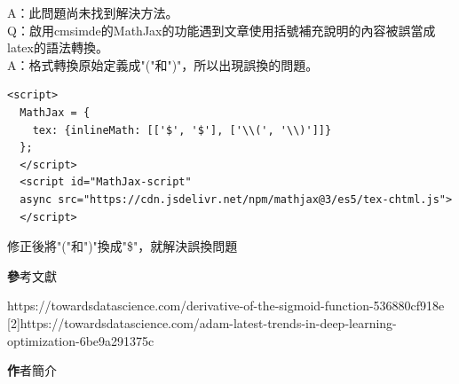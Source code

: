 \documentclass[14pt,a4paper]{report}  %
\begin{document}
A：此問題尚未找到解決方法。\\


Q：啟用cmsimde的MathJax的功能遇到文章使用括號補充說明的內容被誤當成latex的語法轉換。\\

A：格式轉換原始定義成"("和")"，所以出現誤換的問題。\\
\begin{lstlisting}[caption=\Large\sectionef MathJax 程式碼]
<script>
  MathJax = {
    tex: {inlineMath: [['$', '$'], ['\\(', '\\)']]}
  };
  </script>
  <script id="MathJax-script" 
  async src="https://cdn.jsdelivr.net/npm/mathjax@3/es5/tex-chtml.js"> 
  </script>
\end{lstlisting}

修正後將"("和")"換成"\$"，就解決誤換問題
\newpage
\begin{center}
\LARGE\textbf 參考文獻\\
\end{center}
\begin{flushleft}
\begin{Large}
[1]\quad https://towardsdatascience.com/derivative-of-the-sigmoid-function-536880cf918e\\

[2]\quad https://towardsdatascience.com/adam-latest-trends-in-deep-learning-optimization-6be9a291375c\\
\end{Large}
\end{flushleft}
\newpage
\begin{center}
\LARGE\textbf 作者簡介\\
\end{center}
\newpage
\pagestyle{empty}%
\end{document}
